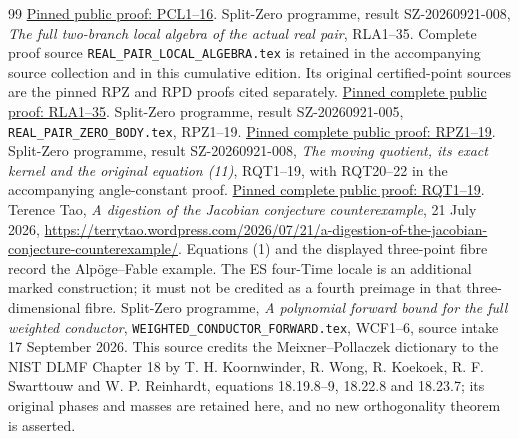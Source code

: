 \documentclass[11pt]{article}
\begin{document}
\begin{thebibliography}{99}
\href{https://github.com/KokunoYumeto/zeta-function-research-reader/blob/487253b5b01851da5b9b98af4e146fecf1fab902/workbenches/splitzero-tandem/continuations/20260919-native-conductor-coprimality/providers/PCL_COMPLETE.tex#L19}{Pinned public proof: PCL1--16}.
 Split-Zero programme, result SZ-20260921-008,
\emph{The full two-branch local algebra of the actual real pair},
RLA1--35. Complete proof source \texttt{REAL\_PAIR\_LOCAL\_ALGEBRA.tex}
is retained in the accompanying source collection and in this cumulative
edition. Its original certified-point sources are the pinned RPZ and RPD
proofs cited separately.
\href{https://github.com/KokunoYumeto/zeta-function-research-reader/blob/7230c00b9f07dd222b2aea95427d67918f3a8cac/workbenches/splitzero-tandem/continuations/20260921-local-covariance-activation/008/REAL_PAIR_LOCAL_ALGEBRA.tex#L41}{Pinned complete public proof: RLA1--35}.
 Split-Zero programme, result SZ-20260921-005, \nolinkurl{REAL_PAIR_ZERO_BODY.tex}, RPZ1--19. \href{https://github.com/KokunoYumeto/zeta-function-research-reader/blob/0fd693c844aad9117e30ec447c59864a28af10f3/workbenches/splitzero-tandem/continuations/20260921-native-spectral-real-pair/005/REAL_PAIR_ZERO_BODY.tex#L18}{Pinned complete public proof: RPZ1--19}.
 Split-Zero programme, result SZ-20260921-008,
\emph{The moving quotient, its exact kernel and the original equation (11)},
RQT1--19, with RQT20--22 in the accompanying angle-constant proof.
\href{https://github.com/KokunoYumeto/zeta-function-research-reader/blob/7230c00b9f07dd222b2aea95427d67918f3a8cac/workbenches/splitzero-tandem/continuations/20260921-local-covariance-activation/008/REAL_PAIR_MOVING_QUOTIENT.tex#L24}{Pinned complete public proof: RQT1--19}.
 Terence Tao, \emph{A digestion of the Jacobian conjecture
counterexample}, 21 July 2026,
\url{https://terrytao.wordpress.com/2026/07/21/a-digestion-of-the-jacobian-conjecture-counterexample/}.
Equations (1) and the displayed three-point fibre record the
Alp\"oge--Fable example. The ES four-Time locale is an additional marked
construction; it must not be credited as a fourth preimage in that
three-dimensional fibre.
 Split-Zero programme, \emph{A polynomial forward bound for
the full weighted conductor}, \texttt{WEIGHTED\_CONDUCTOR\_FORWARD.tex},
WCF1--6, source intake 17 September 2026. This source credits the
Meixner--Pollaczek dictionary to the NIST DLMF Chapter 18 by T. H. Koornwinder, R. Wong, R. Koekoek, R. F. Swarttouw and W. P. Reinhardt, equations
18.19.8--9, 18.22.8 and 18.23.7; its original phases and masses are
retained here, and no new orthogonality theorem is asserted.


\end{thebibliography}
\end{document}

